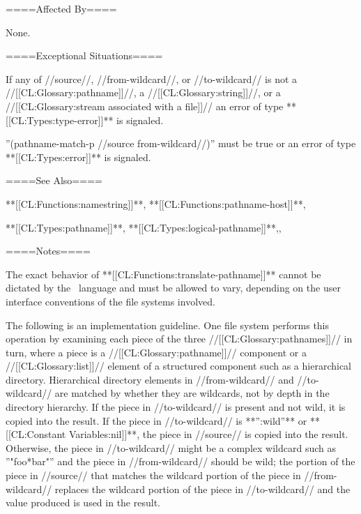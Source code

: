 ====Affected By====

None.

====Exceptional Situations====

If any of //source//, //from-wildcard//, or //to-wildcard// is not a //[[CL:Glossary:pathname]]//, a //[[CL:Glossary:string]]//, or a //[[CL:Glossary:stream associated with a file]]// an error of type **[[CL:Types:type-error]]** is signaled.

''(pathname-match-p //source from-wildcard//)'' must be true or an error of type **[[CL:Types:error]]** is signaled.

====See Also====

**[[CL:Functions:namestring]]**, **[[CL:Functions:pathname-host]]**,

**[[CL:Types:pathname]]**, **[[CL:Types:logical-pathname]]**,{\secref\FileSystemConcepts},

{\secref\PathnamesAsFilenames}

====Notes====

The exact behavior of **[[CL:Functions:translate-pathname]]** cannot be dictated by the \clisp\ language and must be allowed to vary, depending on the user interface conventions of the file systems involved.

The following is an implementation guideline. One file system performs this operation by examining each piece of the three //[[CL:Glossary:pathnames]]// in turn, where a piece is a //[[CL:Glossary:pathname]]// component or a //[[CL:Glossary:list]]// element of a structured component such as a hierarchical directory. Hierarchical directory elements in //from-wildcard// and //to-wildcard// are matched by whether they are wildcards, not by depth in the directory hierarchy. If the piece in //to-wildcard// is present and not wild, it is copied into the result. If the piece in //to-wildcard// is **'':wild''** or **[[CL:Constant Variables:nil]]**, the piece in //source// is copied into the result. Otherwise, the piece in //to-wildcard// might be a complex wildcard such as ''"foo*bar"'' and the piece in //from-wildcard// should be wild; the portion of the piece in //source// that matches the wildcard portion of the piece in //from-wildcard// replaces the wildcard portion of the piece in //to-wildcard// and the value produced is used in the result.

    
